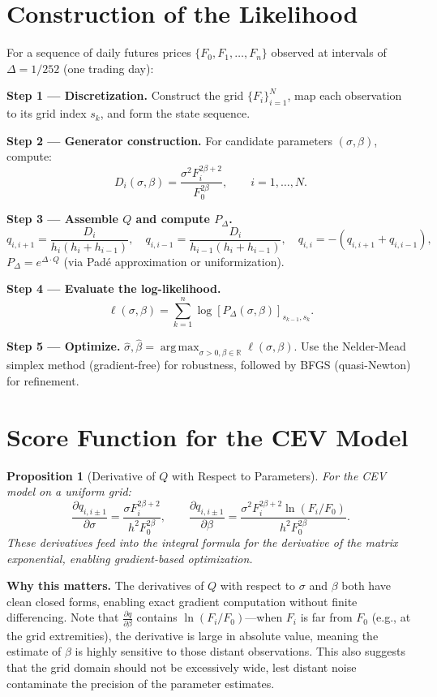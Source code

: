 \documentclass[11pt,a4paper,openany]{book}
\theoremstyle{definition}
\theoremstyle{plain}
\newtheorem{proposition}[theorem]{Proposition}
\theoremstyle{remark}
\DeclareMathOperator*{\argmax}{arg\,max}
\newcommand{\1}{\mathbbm{1}}
\newcommand{\R}{\mathbb{R}}
\begin{document}
\section{Construction of the Likelihood}

For a sequence of daily futures prices $\{F_{0}, F_{1}, \ldots, F_{n}\}$ observed at intervals of $\Delta = 1/252$ (one trading day):

\textbf{Step 1 --- Discretization.} Construct the grid $\{F_{i}\}_{i=1}^{N}$, map each observation to its grid index $s_{k}$, and form the state sequence.

\textbf{Step 2 --- Generator construction.} For candidate parameters $(\sigma, \beta)$, compute:
\[
D_{i}(\sigma, \beta) = \frac{\sigma^{2} F_{i}^{2\beta+2}}{F_{0}^{2\beta}}, \qquad i = 1, \ldots, N.
\]

\textbf{Step 3 --- Assemble $Q$ and compute $P_{\Delta}$.}
\[
q_{i,i+1} = \frac{D_{i}}{h_{i}(h_{i} + h_{i-1})}, \quad q_{i,i-1} = \frac{D_{i}}{h_{i-1}(h_{i} + h_{i-1})}, \quad q_{i,i} = -(q_{i,i+1} + q_{i,i-1}),
\]
$P_{\Delta} = e^{\Delta \cdot Q}$ (via Pad\'{e} approximation or uniformization).

\textbf{Step 4 --- Evaluate the log-likelihood.}
\[
\ell(\sigma, \beta) = \sum_{k=1}^{n} \log [P_{\Delta}(\sigma, \beta)]_{s_{k-1}, s_{k}}.
\]

\textbf{Step 5 --- Optimize.} $\hat{\sigma}, \hat{\beta} = \argmax_{\sigma>0, \beta \in \R} \ell(\sigma, \beta)$. Use the Nelder-Mead simplex method (gradient-free) for robustness, followed by BFGS (quasi-Newton) for refinement.

\section{Score Function for the CEV Model}

\begin{proposition}[Derivative of $Q$ with Respect to Parameters]
For the CEV model on a uniform grid:
\[
\frac{\partial q_{i,i\pm 1}}{\partial \sigma} = \frac{\sigma F_{i}^{2\beta+2}}{h^{2} F_{0}^{2\beta}}, \qquad
\frac{\partial q_{i,i\pm 1}}{\partial \beta} = \frac{\sigma^{2} F_{i}^{2\beta+2} \ln(F_{i}/F_{0})}{h^{2} F_{0}^{2\beta}}.
\]
These derivatives feed into the integral formula for the derivative of the matrix exponential, enabling gradient-based optimization.
\end{proposition}

\medskip
\noindent\textbf{Why this matters.} The derivatives of $Q$ with respect to $\sigma$ and $\beta$ both have clean closed forms, enabling exact gradient computation without finite differencing. Note that $\frac{\partial q}{\partial\beta}$ contains $\ln(F_i/F_0)$---when $F_i$ is far from $F_0$ (e.g., at the grid extremities), the derivative is large in absolute value, meaning the estimate of $\beta$ is highly sensitive to those distant observations. This also suggests that the grid domain should not be excessively wide, lest distant noise contaminate the precision of the parameter estimates.
\end{document}
